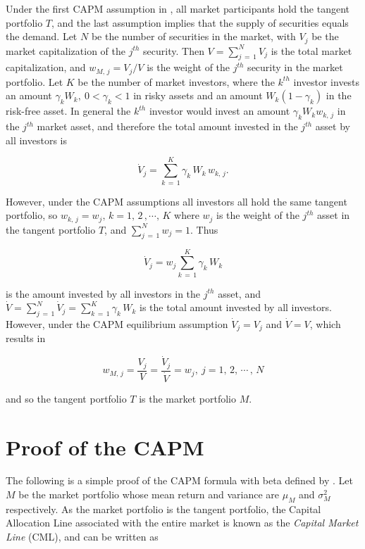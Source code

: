\documentclass[graybox,envcountchap,sectrefs]{svmono}\usepackage[]{graphicx}\usepackage[]{xcolor}
\begin{document}
\begin{appendices}
Under the first CAPM assumption in \CAPM, all market participants
hold the tangent portfolio $T$, and the last assumption implies that
the supply of securities equals the demand. Let $N$ be the number
of securities in the market, with $V_{j}$ be the market capitalization
of the $j^{th}$ security. Then $V=\sum_{j\,=\,1}^{N}V_{j}$ is the
total market capitalization, and $w_{M,\,j}=V_{j}/V$ is the weight
of the $j^{th}$ security in the market portfolio. Let $K$ be the
number of market investors, where the $k^{th}$ investor invests an
amount $\gamma_{k}W_{k},\ 0<\gamma_{k}<1$ in risky assets and an
amount $W_{k}(1-\gamma_{k})$ in the risk-free asset. In general the
$k^{th}$ investor would invest an amount $\gamma_{k}W_{k}w_{k,\,j}$
in the $j^{th}$ market asset, and therefore the total amount invested
in the $j^{th}$ asset by all investors is

\[
\dot{V}_{j}=\sum_{k\,=\,1}^{K}\gamma_{k}\,W_{k}\,w_{k,\,j}.
\]

However, under the CAPM assumptions all investors all hold the same
tangent portfolio, so $w_{k,\,j}=w_{j},\,k=1,\,2\,,\cdots,\,K$ where
$w_{j}$ is the weight of the $j^{th}$ asset in the tangent portfolio
$T$, and $\sum_{j\,=\,1}^{N}w_{j}=1$. Thus

\[
\dot{V}_{j}=w_{j}\sum_{k\,=\,1}^{K}\gamma_{k}\,W_{k}
\]

is the amount invested by all investors in the $j^{th}$ asset, and
$\dot{V}=\sum_{j\,=\,1}^{N}\dot{V}_{j}=\sum_{k\,=\,1}^{K}\gamma_{k}\,W_{k}$
is the total amount invested by all investors. However, under the
CAPM equilibrium assumption $\dot{V}_{j}=V_{j}$ and $\dot{V}=V$,
which results in

\[
w_{M,\,j}=\dfrac{V_{j}}{V}=\dfrac{\dot{V}_{j}}{\dot{V}}=w_{j},\ j=1,\,2,\,\cdots\,,\,N
\]

and so the tangent portfolio $T$ is the market portfolio $M$.

\section{Proof of the CAPM\label{subsec: CAPMproof}}

The following is a simple proof of the CAPM formula \CAPMformula
with beta defined by \CAPMbeta. Let $M$ be the market portfolio
whose mean return and variance are $\mu_{M}$ and $\sigma_{M}^{2}$
respectively. As the market portfolio is the tangent portfolio, the
Capital Allocation Line associated with the entire market is known
as the \emph{Capital Market Line} (CML), and can be written as 


\end{appendices}
\end{document}
